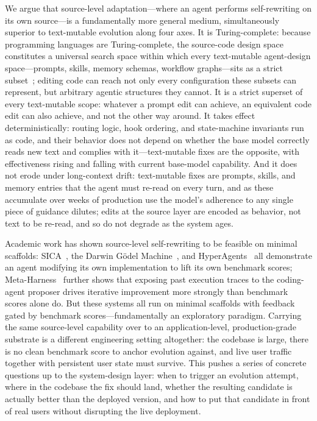 \documentclass{article}
\begin{document}
We argue that source-level adaptation---where an agent performs self-rewriting on its own source---is a fundamentally more general medium, simultaneously superior to text-mutable evolution along four axes. It is Turing-complete: because programming languages are Turing-complete, the source-code design space constitutes a universal search space within which every text-mutable agent-design space---prompts, skills, memory schemas, workflow graphs---sits as a strict subset~\citep{hu2025automated}; editing code can reach not only every configuration these subsets can represent, but arbitrary agentic structures they cannot. It is a strict superset of every text-mutable scope: whatever a prompt edit can achieve, an equivalent code edit can also achieve, and not the other way around. It takes effect deterministically: routing logic, hook ordering, and state-machine invariants run as code, and their behavior does not depend on whether the base model correctly reads new text and complies with it---text-mutable fixes are the opposite, with effectiveness rising and falling with current base-model capability. And it does not erode under long-context drift: text-mutable fixes are prompts, skills, and memory entries that the agent must re-read on every turn, and as these accumulate over weeks of production use the model's adherence to any single piece of guidance dilutes; edits at the source layer are encoded as behavior, not text to be re-read, and so do not degrade as the system ages.

Academic work has shown source-level self-rewriting to be feasible on minimal scaffolds: SICA~\citep{robeyns2025self}, the Darwin G\"{o}del Machine~\citep{zhang2025darwin}, and HyperAgents~\citep{zhang2026hyperagents} all demonstrate an agent modifying its own implementation to lift its own benchmark scores; Meta-Harness~\citep{lee2026meta} further shows that exposing past execution traces to the coding-agent proposer drives iterative improvement more strongly than benchmark scores alone do. But these systems all run on minimal scaffolds with feedback gated by benchmark scores---fundamentally an exploratory paradigm. Carrying the same source-level capability over to an application-level, production-grade substrate is a different engineering setting altogether: the codebase is large, there is no clean benchmark score to anchor evolution against, and live user traffic together with persistent user state must survive. This pushes a series of concrete questions up to the system-design layer: when to trigger an evolution attempt, where in the codebase the fix should land, whether the resulting candidate is actually better than the deployed version, and how to put that candidate in front of real users without disrupting the live deployment.
\end{document}
